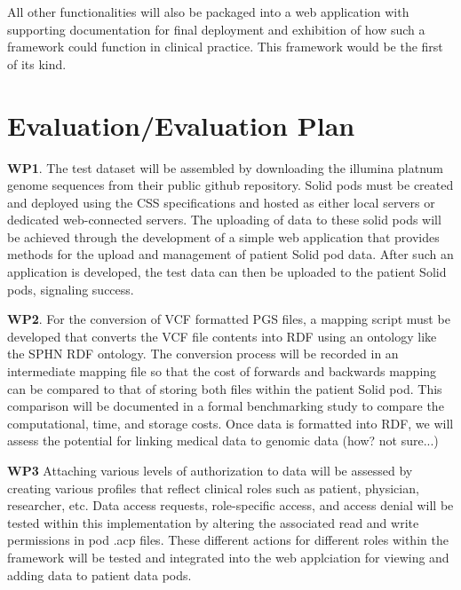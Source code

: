 \documentclass[runningheads]{llncs}
\begin{document}
All other functionalities will also be packaged into a web application with supporting documentation for final deployment and exhibition of how such a framework could function in clinical practice.
This framework would be the first of its kind.

\section{Evaluation/Evaluation Plan}

\textbf{WP1}.
The test dataset will be assembled by downloading the illumina platnum genome sequences from their public github repository.
Solid pods must be created and deployed using the CSS specifications and hosted as either local servers or dedicated web-connected servers.
The uploading of data to these solid pods will be achieved through the development of a simple web application that provides methods for the upload and management of patient Solid pod data. 
After such an application is developed, the test data can then be uploaded to the patient Solid pods, signaling success.

\textbf{WP2}.
For the conversion of VCF formatted PGS files, a mapping script must be developed that converts the VCF file contents into RDF using an ontology like the SPHN RDF ontology. 
The conversion process will be recorded in an intermediate mapping file so that the cost of forwards and backwards mapping can be compared to that of storing both files within the patient Solid pod. 
This comparison will be documented in a formal benchmarking study to compare the computational, time, and storage costs.
Once data is formatted into RDF, we will assess the potential for linking medical data to genomic data (how? not sure...)

\textbf{WP3}
Attaching various levels of authorization to data will be assessed by creating various profiles that reflect clinical roles such as patient, physician, researcher, etc. 
Data access requests, role-specific access, and access denial will be tested within this implementation by altering the associated read and write permissions in pod .acp files.
These different actions for different roles within the framework will be tested and integrated into the web applciation for viewing and adding data to patient data pods. 
\end{document}
